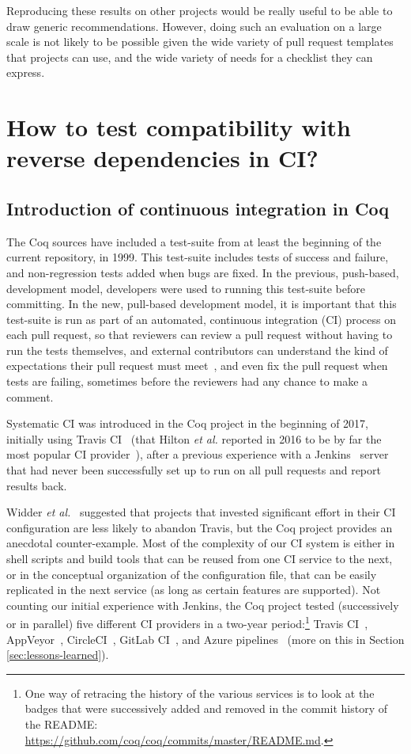 Reproducing these results on other projects would be really useful to be able to draw generic recommendations.
However, doing such an evaluation on a large scale is not likely to be possible given the wide variety of pull request templates that projects can use, and the wide variety of needs for a checklist they can express.

\section{How to test compatibility with reverse dependencies in CI?}

\label{sec:ci}

\subsection{Introduction of continuous integration in Coq}

The Coq sources have included a test-suite from at least the beginning of the current repository, in 1999.
This test-suite includes tests of success and failure, and non-regression tests added when bugs are fixed.
In the previous, push-based, development model, developers were used to running this test-suite before committing.
In the new, pull-based development model, it is important that this test-suite is run as part of an automated, continuous integration (CI) process on each pull request, so that reviewers can review a pull request without having to run the tests themselves, and external contributors can understand the kind of expectations their pull request must meet~\cite{gousios2016work}, and even fix the pull request when tests are failing, sometimes before the reviewers had any chance to make a comment.

Systematic CI was introduced in the Coq project in the beginning of 2017, initially using Travis CI~\cite{travisci} (that Hilton \emph{et al.} reported in 2016 to be by far the most popular CI provider~\cite{hilton2016usage}), after a previous experience with a Jenkins~\cite{jenkins} server that had never been successfully set up to run on all pull requests and report results back.

Widder \emph{et al.}~\cite{widder2018m} suggested that projects that invested significant effort in their CI configuration are less likely to abandon Travis, but the Coq project provides an anecdotal counter-example. Most of the complexity of our CI system is either in shell scripts and build tools that can be reused from one CI service to the next, or in the conceptual organization of the configuration file, that can be easily replicated in the next service (as long as certain features are supported). Not counting our initial experience with Jenkins, the Coq project tested (successively or in parallel) five different CI providers in a two-year period:\footnote{
	One way of retracing the history of the various services is to look at the badges that were successively added and removed in the commit history of the README: \url{https://github.com/coq/coq/commits/master/README.md}.
}
Travis CI~\cite{travisci}, AppVeyor~\cite{appveyor}, CircleCI~\cite{circleci}, GitLab CI~\cite{gitlab}, and Azure pipelines~\cite{azure_pipelines} (more on this in Section \ref{sec:lessons-learned}).

